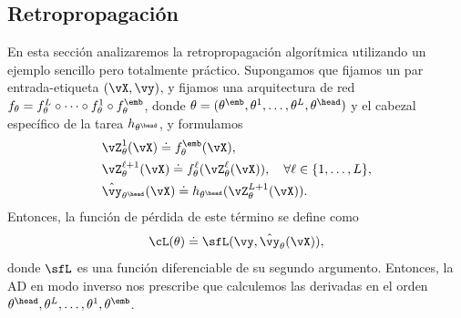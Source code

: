 \documentclass[../../book-main_es.tex]{subfiles}
\begin{document}
\subsection{Retropropagación}
\label{app:BP-section}
En esta sección analizaremos la retropropagación algorítmica utilizando un
ejemplo sencillo pero totalmente práctico. Supongamos que fijamos un
par entrada-etiqueta \((\vX, \vy)\), y fijamos una arquitectura de red
\(f_{\theta} = f_{\theta}^{L} \circ \cdots \circ f_{\theta}^{1} \circ
f_{\theta}^{\emb}\), donde \(\theta = (\theta^{\emb}, \theta^{1},
\dots, \theta^{L}, \theta^{\head})\) y el cabezal específico de la tarea
\(h_{\theta^{\head}}\), y formulamos
\begin{align}
    &\vZ_{\theta}^{1}(\vX) \doteq f_{\theta}^{\emb}(\vX), \\
    &\vZ_{\theta}^{\ell + 1}(\vX) \doteq
    f_{\theta}^{\ell}(\vZ_{\theta}^{\ell}(\vX)), \quad \forall \ell
    \in \{1, \dots, L\}, \\
    &\hat{\vy}_{\theta^{\head}}(\vX) \doteq h_{\theta^{\head}}(\vZ_{\theta}^{L+1}(\vX)).
\end{align}
Entonces, la función de pérdida de este término se define como
\begin{equation}
    \cL(\theta) \doteq \sfL(\vy, \hat{\vy}_{\theta}(\vX)),
\end{equation}
donde \(\sfL\) es una función diferenciable de su segundo argumento.
Entonces, la AD en modo inverso nos prescribe que calculemos las derivadas en
el orden \(\theta^{\head}, \theta^{L}, \dots, \theta^{1}, \theta^{\emb}\).
\end{document}
